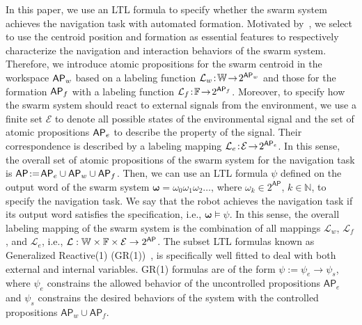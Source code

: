 \documentclass[letterpaper, 10 pt, conference]{ieeeconf}
\begin{document}
In this paper, we use an LTL formula to specify whether the swarm system achieves the navigation task with automated formation. Motivated by~\cite{calin2007tro}, we select to use the centroid position and formation as essential features to respectively characterize the navigation and interaction behaviors of the swarm system. Therefore, we introduce atomic propositions for the swarm centroid in the workspace $\mathsf{AP}_w$ based on a labeling function $\mathcal{L}_w\!:\!\mathbb W\!\rightarrow\!2^{\mathsf{AP}_w}$ and those for the formation $\mathsf{AP}_f$ with a labeling function $\mathcal{L}_f\!:\!\mathbb F \!\rightarrow\!2^{\mathsf{AP}_f}$. Moreover, to specify how the swarm system should react to external signals from the environment, we use a finite set $\mathcal{E}$ to denote all possible states of the environmental signal and the set of atomic propositions $\mathsf{AP}_e$ to describe the property of the signal. Their correspondence is described by a labeling mapping $\mathcal{L}_e\!:\!\mathcal{E}\!\rightarrow\!2^{\mathsf{AP}_e}$. In this sense, the overall set of atomic propositions of the swarm system for the navigation task is $\mathsf{AP}\!:=\!\mathsf{AP}_e\cup\mathsf{AP}_w\cup\mathsf{AP}_f$. Then, we can use an LTL formula $\psi$ defined on the output word of the swarm system $\pmb{\omega} = \omega_0 \omega_{1} \omega_{2} \dots$, where $\omega_k\!\in\!2^{\mathsf{AP}}$, $k\!\in\!\mathbb{N}$, to specify the navigation task. We say that the robot achieves the navigation task if its output word satisfies the specification, i.e., $\pmb{\omega}\vDash \psi$. In this sense, the overall labeling mapping of the swarm system is the combination of all mappings $\mathcal{L}_w$, $\mathcal{L}_f$, and $\mathcal{L}_e$, i.e., $\mathcal{L}: \mathbb{W} \times \mathbb{F} \times \mathcal{E} \rightarrow 2^{\mathsf{AP}}$. The subset LTL formulas known as Generalized Reactive(1) (GR(1))~\cite{BLOEM2012911}, is specifically well fitted to deal with both external and internal variables. GR(1) formulas are of the form  $\psi:= \psi_e \rightarrow \psi_s$, where $\psi_e$ constrains the allowed behavior of the uncontrolled propositions  $\mathsf{AP}_e$ and $\psi_s$ constrains the desired behaviors of the system with the controlled propositions $\mathsf{AP}_w \cup\mathsf{AP}_f$.
\end{document}
